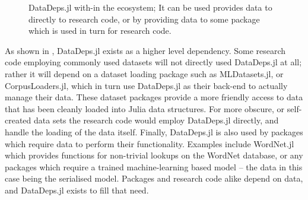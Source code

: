 \documentclass[twoside,11pt]{article}\usepackage{jmlr2e}
\begin{document}
\begin{figure}
	\centering
	\caption{DataDeps.jl with-in the ecosystem; It can be used provides data to directly to research code, or by providing data to some package which is used in turn for research code. \label{fig:eco}}
\end{figure}

As shown in , DataDeps.jl exists as a higher level dependency.
Some research code employing commonly used datasets will not directly used DataDeps.jl at all;
rather it will depend on a dataset loading package such as MLDatasets.jl,
or CorpusLoaders.jl, which in turn use DataDeps.jl as their back-end to actually manage their data.
These dataset packages provide a more friendly access to data that has been cleanly loaded into Julia data structures.
For more obscure, or self-created data sets the research code would employ DataDeps.jl directly, and handle the loading of the data itself.
Finally, DataDeps.jl is also used by packages which require data to perform their functionality.
Examples include WordNet.jl which provides functions for non-trivial lookups on the WordNet \citep{miller1995wordnet} database,
or any packages which require a trained machine-learning based model -- the data in this case being the serialised model.
Packages and research code alike depend on data, and DataDeps.jl exists to fill that need.
\end{document}
